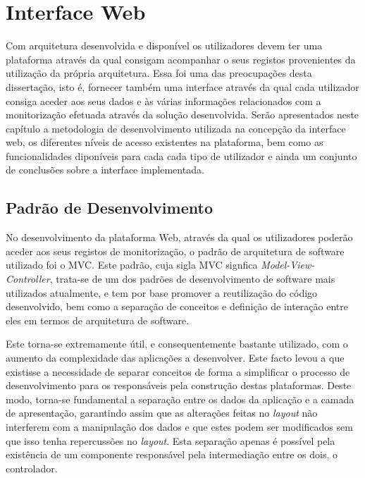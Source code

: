 \chapter{Interface Web}

Com arquitetura desenvolvida e disponível os utilizadores devem ter uma plataforma através da qual consigam acompanhar o seus registos provenientes da utilização da própria arquitetura. Essa foi uma das preocupações desta dissertação, isto é, fornecer também uma interface através da qual cada utilizador consiga aceder aos seus dados e às várias informações relacionados com a monitorização efetuada através da solução desenvolvida. Serão apresentados neste capítulo a metodologia de desenvolvimento utilizada na concepção da interface web, os diferentes níveis de acesso existentes na plataforma, bem como as funcionalidades diponíveis para cada cada tipo de utilizador e ainda um conjunto de conclusões sobre a interface implementada.

\section{Padrão de Desenvolvimento}

No desenvolvimento da plataforma Web, através da qual os utilizadores poderão aceder aos seus registos de monitorização, o padrão de arquitetura de software utilizado foi o MVC. Este padrão, cuja sigla MVC signfica \textit{Model-View-Controller}, trata-se de um dos padrões de desenvolvimento de software mais utilizados atualmente, e tem por base promover a reutilização do código desenvolvido, bem como a separação de conceitos e definição de interação entre eles em termos de arquitetura de software\cite{bucanek2009model}. 

Este torna-se extremamente útil, e consequentemente bastante utilizado, com o aumento da complexidade das aplicações a desenvolver. Este facto levou a que existisse a necessidade de separar conceitos de forma a simplificar o processo de desenvolvimento para os responsáveis pela construção destas plataformas. Deste modo, torna-se fundamental a separação entre os dados da aplicação e a camada de apresentação, garantindo assim que as alterações feitas no \textit{layout} não interferem com a manipulação dos dados e que estes podem ser modificados sem que isso tenha repercussões no \textit{layout}. Esta separação apenas é possível pela existência de um componente responsável pela intermediação entre os dois, o controlador\cite{bucanek2009model}.


